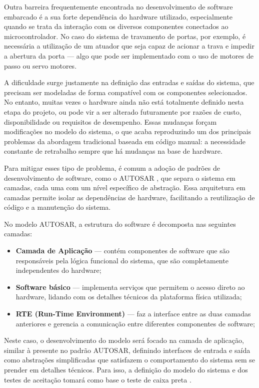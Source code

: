 Outra barreira frequentemente  encontrada no desenvolvimento de software embarcado é a sua forte dependência do hardware utilizado, especialmente quando se trata 
da interação com os diversos componentes conectados ao microcontrolador. No caso do sistema de travamento de portas, por exemplo, é necessária a utilização de um 
atuador que seja capaz de acionar a trava e impedir a abertura da porta — algo que pode ser implementado com o uso de motores de passo ou servo motores.

A dificuldade surge justamente na definição das entradas e saídas do sistema, que precisam ser modeladas de forma compatível com os componentes selecionados. No 
entanto, muitas vezes o hardware ainda não está totalmente definido nesta etapa do projeto, ou pode vir a ser alterado futuramente por razões de custo, 
disponibilidade ou requisitos de desempenho. Essas mudanças forçam modificações no modelo do sistema, o que acaba reproduzindo um dos principais problemas da 
abordagem tradicional baseada em código manual: a necessidade constante de retrabalho sempre que há mudanças na base de hardware.

Para mitigar esses tipo de problema, é comum a adoção de padrões de desenvolvimento de software, como o AUTOSAR \cite{autosarClassic}, que separa o sistema em 
camadas, cada uma com um nível específico de abstração. Essa arquitetura em camadas permite isolar as dependências de hardware, facilitando a reutilização de 
código e a manutenção do sistema. 

No modelo AUTOSAR, a estrutura do software é decomposta nas seguintes camadas:

\begin{itemize}
	\item \textbf{Camada de Aplicação} — contém componentes de software que são responsáveis pela lógica funcional do sistema, que são completamente independentes do hardware;
	\item \textbf{Software básico} — implementa serviços que permitem o acesso direto ao hardware, lidando com os detalhes técnicos da plataforma física utilizada;
	\item \textbf{RTE (Run-Time Environment)} — faz a interface entre as duas camadas anteriores e gerencia a comunicação entre diferentes componentes de software;
\end{itemize}

Neste caso, o desenvolvimento do modelo será focado na camada de aplicação, similar à presente no padrão AUTOSAR, definindo interfaces de entrada e saída como 
abstrações simplificadas que satisfazem o comportamento do sistema sem se prender em detalhes técnicos. Para isso, a definição do modelo do sistema e dos testes 
de aceitação tomará como base o teste de caixa preta \cite{sommerville2019}.

